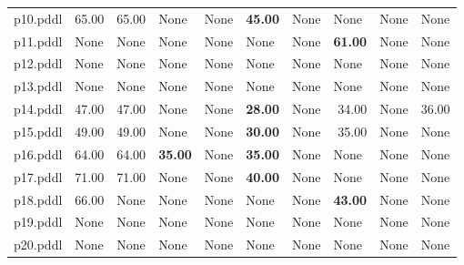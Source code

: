 \documentclass{article}
\begin{document}
\begin{tabular}{@{}lrrrrrrrrr@{}}
p10.pddl & 65.00 & 65.00 & \multicolumn{1}{|l|}{None} & \multicolumn{1}{|l|}{None} & \textbf{45.00} & \multicolumn{1}{|l|}{None} & \multicolumn{1}{|l|}{None} & \multicolumn{1}{|l|}{None} & \multicolumn{1}{|l|}{None} \\
p11.pddl & \multicolumn{1}{|l|}{None} & \multicolumn{1}{|l|}{None} & \multicolumn{1}{|l|}{None} & \multicolumn{1}{|l|}{None} & \multicolumn{1}{|l|}{None} & \multicolumn{1}{|l|}{None} & \textbf{61.00} & \multicolumn{1}{|l|}{None} & \multicolumn{1}{|l|}{None} \\
p12.pddl & \multicolumn{1}{|l|}{None} & \multicolumn{1}{|l|}{None} & \multicolumn{1}{|l|}{None} & \multicolumn{1}{|l|}{None} & \multicolumn{1}{|l|}{None} & \multicolumn{1}{|l|}{None} & \multicolumn{1}{|l|}{None} & \multicolumn{1}{|l|}{None} & \multicolumn{1}{|l|}{None} \\
p13.pddl & \multicolumn{1}{|l|}{None} & \multicolumn{1}{|l|}{None} & \multicolumn{1}{|l|}{None} & \multicolumn{1}{|l|}{None} & \multicolumn{1}{|l|}{None} & \multicolumn{1}{|l|}{None} & \multicolumn{1}{|l|}{None} & \multicolumn{1}{|l|}{None} & \multicolumn{1}{|l|}{None} \\
p14.pddl & 47.00 & 47.00 & \multicolumn{1}{|l|}{None} & \multicolumn{1}{|l|}{None} & \textbf{28.00} & \multicolumn{1}{|l|}{None} & 34.00 & \multicolumn{1}{|l|}{None} & 36.00 \\
p15.pddl & 49.00 & 49.00 & \multicolumn{1}{|l|}{None} & \multicolumn{1}{|l|}{None} & \textbf{30.00} & \multicolumn{1}{|l|}{None} & 35.00 & \multicolumn{1}{|l|}{None} & \multicolumn{1}{|l|}{None} \\
p16.pddl & 64.00 & 64.00 & \textbf{35.00} & \multicolumn{1}{|l|}{None} & \textbf{35.00} & \multicolumn{1}{|l|}{None} & \multicolumn{1}{|l|}{None} & \multicolumn{1}{|l|}{None} & \multicolumn{1}{|l|}{None} \\
p17.pddl & 71.00 & 71.00 & \multicolumn{1}{|l|}{None} & \multicolumn{1}{|l|}{None} & \textbf{40.00} & \multicolumn{1}{|l|}{None} & \multicolumn{1}{|l|}{None} & \multicolumn{1}{|l|}{None} & \multicolumn{1}{|l|}{None} \\
p18.pddl & 66.00 & \multicolumn{1}{|l|}{None} & \multicolumn{1}{|l|}{None} & \multicolumn{1}{|l|}{None} & \multicolumn{1}{|l|}{None} & \multicolumn{1}{|l|}{None} & \textbf{43.00} & \multicolumn{1}{|l|}{None} & \multicolumn{1}{|l|}{None} \\
p19.pddl & \multicolumn{1}{|l|}{None} & \multicolumn{1}{|l|}{None} & \multicolumn{1}{|l|}{None} & \multicolumn{1}{|l|}{None} & \multicolumn{1}{|l|}{None} & \multicolumn{1}{|l|}{None} & \multicolumn{1}{|l|}{None} & \multicolumn{1}{|l|}{None} & \multicolumn{1}{|l|}{None} \\
p20.pddl & \multicolumn{1}{|l|}{None} & \multicolumn{1}{|l|}{None} & \multicolumn{1}{|l|}{None} & \multicolumn{1}{|l|}{None} & \multicolumn{1}{|l|}{None} & \multicolumn{1}{|l|}{None} & \multicolumn{1}{|l|}{None} & \multicolumn{1}{|l|}{None} & \multicolumn{1}{|l|}{None} \\
\end{tabular}
\end{document}

